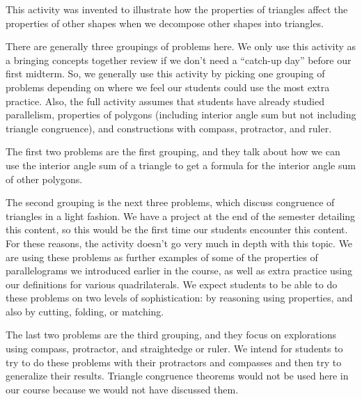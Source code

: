 \documentclass[nooutcomes]{ximera}
\begin{document}
\begin{instructorNotes}
This activity was invented to illustrate how the properties of triangles affect the properties of other shapes when we decompose other shapes into triangles.

There are generally three groupings of problems here.  We only use this activity as a bringing concepts together review if we don't need a ``catch-up day'' before our first midterm.  So, we generally use this activity by picking one grouping of problems depending on where we feel our students could use the most extra practice.  Also, the full activity assumes that students have already studied parallelism, properties of polygons (including interior angle sum but not including triangle congruence), and constructions with compass, protractor, and ruler.

The first two problems are the first grouping, and they talk about how we can use the interior angle sum of a triangle to get a formula for the interior angle sum of other polygons.  

The second grouping is the next three problems, which discuss congruence of triangles in a light fashion.  We have a project at the end of the semester detailing this content, so this would be the first time our students encounter this content.  For these reasons, the activity doesn't go very much in depth with this topic.  We are using these problems as further examples of some of the properties of parallelograms we introduced earlier in the course, as well as extra practice using our definitions for various quadrilaterals.  We expect students to be able to do these problems on two levels of sophistication: by reasoning using properties, and also by cutting, folding, or matching. 

The last two problems are the third grouping, and they focus on explorations using compass, protractor, and straightedge or ruler.  We intend for students to try to do these problems with their protractors and compasses and then try to generalize their results.  Triangle congruence theorems would not be used here in our course because we would not have discussed them.





\end{instructorNotes}
\end{document}

